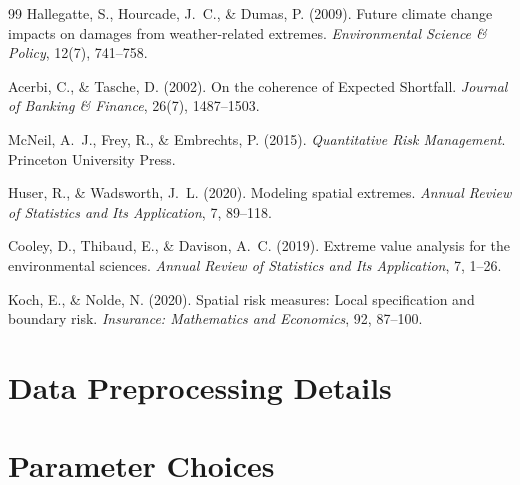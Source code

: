 \documentclass[12pt]{article}
\begin{document}
\begin{thebibliography}{99}
Hallegatte, S., Hourcade, J.~C., \& Dumas, P. (2009).
\newblock Future climate change impacts on damages from weather-related extremes.
\newblock \emph{Environmental Science \& Policy}, 12(7), 741--758.

Acerbi, C., \& Tasche, D. (2002).
\newblock On the coherence of Expected Shortfall.
\newblock \emph{Journal of Banking \& Finance}, 26(7), 1487--1503.

McNeil, A.~J., Frey, R., \& Embrechts, P. (2015).
\newblock \emph{Quantitative Risk Management}.
\newblock Princeton University Press.

Huser, R., \& Wadsworth, J.~L. (2020).
\newblock Modeling spatial extremes.
\newblock \emph{Annual Review of Statistics and Its Application}, 7, 89--118.

Cooley, D., Thibaud, E., \& Davison, A.~C. (2019).
\newblock Extreme value analysis for the environmental sciences.
\newblock \emph{Annual Review of Statistics and Its Application}, 7, 1--26.

Koch, E., \& Nolde, N. (2020).
\newblock Spatial risk measures: Local specification and boundary risk.
\newblock \emph{Insurance: Mathematics and Economics}, 92, 87--100.
























\end{thebibliography}





\appendix
\section{Data Preprocessing Details}

\section{Parameter Choices}
\end{document}
